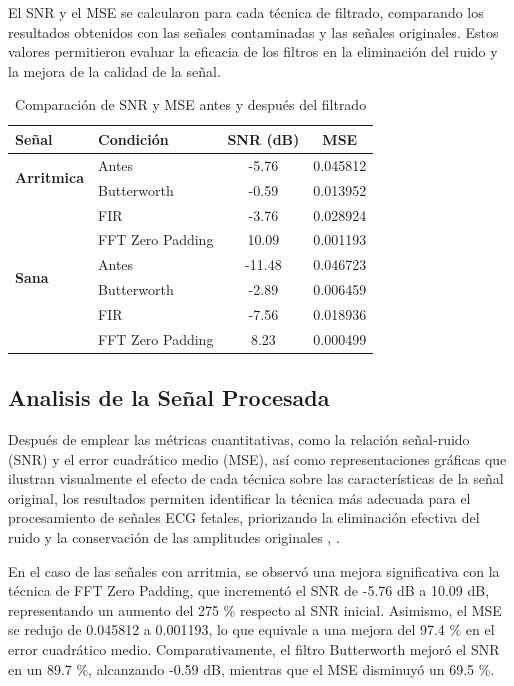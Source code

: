 \documentclass[10pt, conference]{IEEEtran}
\begin{document}
El SNR y el MSE se calcularon para cada técnica de filtrado, comparando los resultados obtenidos con las señales contaminadas y las señales originales. Estos valores permitieron evaluar la eficacia de los filtros en la eliminación del ruido y la mejora de la calidad de la señal.

\begin{table}[h!]
	\centering
	\caption{Comparación de SNR y MSE antes y después del filtrado}
	\label{tab:snr_mse_comparison}
	\begin{tabular}{l l c c}
	\toprule
	\textbf{Señal} & \textbf{Condición} & \textbf{SNR (dB)} & \textbf{MSE} \\
	\midrule
	\multirow{2}{*}{\textbf{Arritmica}} & Antes & -5.76 & 0.045812 \\
	 & Butterworth & -0.59 & 0.013952 \\
	 & FIR & -3.76 & 0.028924 \\
	 & FFT Zero Padding & 10.09 & 0.001193 \\
	\midrule
	\multirow{2}{*}{\textbf{Sana}} & Antes & -11.48 & 0.046723 \\
	 & Butterworth & -2.89 & 0.006459 \\
	 & FIR & -7.56 & 0.018936 \\
	 & FFT Zero Padding & 8.23 & 0.000499 \\
	\bottomrule
	\end{tabular}
\end{table}

\subsection{Analisis de la Señal Procesada}

Después de emplear las métricas cuantitativas, como la relación señal-ruido (SNR) y el error cuadrático medio (MSE), así como representaciones gráficas que ilustran visualmente el efecto de cada técnica sobre las características de la señal original, los resultados permiten identificar la técnica más adecuada para el procesamiento de señales ECG fetales, priorizando la eliminación efectiva del ruido y la conservación de las amplitudes originales \cite{sensors2022}, \cite{behar2019noninvasive}. 

En el caso de las señales con arritmia, se observó una mejora significativa con la técnica de FFT Zero Padding, que incrementó el SNR de -5.76 dB a 10.09 dB, representando un aumento del 275 \% respecto al SNR inicial. Asimismo, el MSE se redujo de 0.045812 a 0.001193, lo que equivale a una mejora del 97.4 \% en el error cuadrático medio. Comparativamente, el filtro Butterworth mejoró el SNR en un 89.7 \%, alcanzando -0.59 dB, mientras que el MSE disminuyó un 69.5 \%. 
\end{document}
